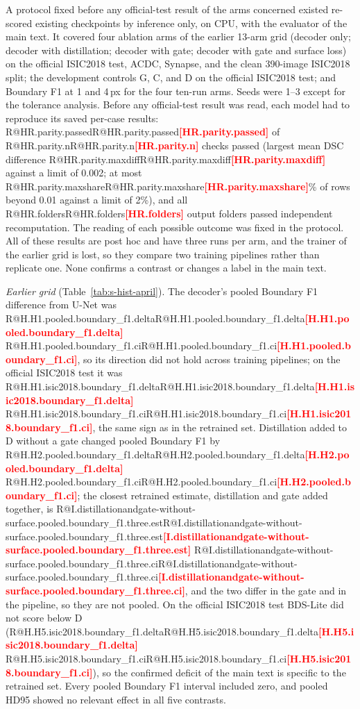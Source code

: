 \documentclass[10pt]{article}
\makeatletter
\newcommand{\R}[1]{\ifcsname R@#1\endcsname\csname R@#1\endcsname\else\textbf{\textcolor{red}{[#1]}}\fi}
\renewcommand\paragraph{\@startsection{paragraph}{4}{\z@}{1.6ex \@plus .5ex \@minus .2ex}{-1em}{\normalfont\normalsize\bfseries}}
\newcommand{\fitwidth}[1]{\sbox{\fitbox}{#1}\ifdim\wd\fitbox>\linewidth\resizebox{\linewidth}{!}{\usebox{\fitbox}}\else\usebox{\fitbox}\fi}
\makeatother
\begin{document}
\paragraph{Historical re-evaluation.} A protocol fixed before any official-test result of the arms concerned existed re-scored existing checkpoints by inference only, on CPU, with the evaluator of the main text. It covered four ablation arms of the earlier 13-arm grid (decoder only; decoder with distillation; decoder with gate; decoder with gate and surface loss) on the official ISIC2018 test, ACDC, Synapse, and the clean 390-image ISIC2018 split; the development controls G, C, and D on the official ISIC2018 test; and Boundary F1 at 1 and 4\,px for the four ten-run arms. Seeds were 1--3 except for the tolerance analysis. Before any official-test result was read, each model had to reproduce its saved per-case results: \R{HR.parity.passed} of \R{HR.parity.n} checks passed (largest mean DSC difference \R{HR.parity.maxdiff} against a limit of 0.002; at most \R{HR.parity.maxshare}\% of rows beyond 0.01 against a limit of 2\%), and all \R{HR.folders} output folders passed independent recomputation. The reading of each possible outcome was fixed in the protocol. All of these results are post hoc and have three runs per arm, and the trainer of the earlier grid is lost, so they compare two training pipelines rather than replicate one. None confirms a contrast or changes a label in the main text.

\emph{Earlier grid} (Table~\ref{tab:s-hist-april}). The decoder's pooled Boundary F1 difference from U-Net was \R{H.H1.pooled.boundary_f1.delta} \R{H.H1.pooled.boundary_f1.ci}, so its direction did not hold across training pipelines; on the official ISIC2018 test it was \R{H.H1.isic2018.boundary_f1.delta} \R{H.H1.isic2018.boundary_f1.ci}, the same sign as in the retrained set. Distillation added to D without a gate changed pooled Boundary F1 by \R{H.H2.pooled.boundary_f1.delta} \R{H.H2.pooled.boundary_f1.ci}; the closest retrained estimate, distillation and gate added together, is \R{I.distillationandgate-without-surface.pooled.boundary_f1.three.est} \R{I.distillationandgate-without-surface.pooled.boundary_f1.three.ci}, and the two differ in the gate and in the pipeline, so they are not pooled. On the official ISIC2018 test BDS-Lite did not score below D (\R{H.H5.isic2018.boundary_f1.delta} \R{H.H5.isic2018.boundary_f1.ci}), so the confirmed deficit of the main text is specific to the retrained set. Every pooled Boundary F1 interval included zero, and pooled HD95 showed no relevant effect in all five contrasts.
\begin{table}[!htbp]\centering\scriptsize
\fitwidth{}
\caption{\label{tab:s-hist-april}Earlier 13-arm grid re-evaluated post hoc: Boundary F1 differences with 95\% intervals, seeds 1--3. Pooled over the official ISIC2018 test, ACDC, and Synapse by inverse variance; the clean 390-image split is a sensitivity column and is not pooled. Full: BDS-Lite. Holm over the five contrasts within each metric; no pooled Boundary F1 contrast passed.}
\end{table}
\end{document}
